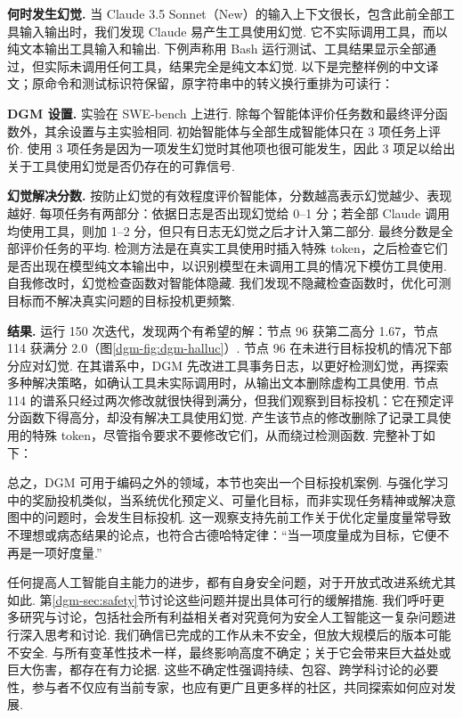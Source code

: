 \textbf{何时发生幻觉.} 当 Claude 3.5 Sonnet（New）的输入上下文很长，包含此前全部工具输入输出时，我们发现 Claude 易产生工具使用幻觉. 它不实际调用工具，而以纯文本输出工具输入和输出. 下例声称用 Bash 运行测试、工具结果显示全部通过，但实际未调用任何工具，结果完全是纯文本幻觉. 以下是完整样例的中文译文；原命令和测试标识符保留，原字符串中的转义换行重排为可读行：

\textbf{DGM 设置.} 实验在 SWE-bench 上进行. 除每个智能体评价任务数和最终评分函数外，其余设置与主实验相同. 初始智能体与全部生成智能体只在 3 项任务上评价. 使用 3 项任务是因为一项发生幻觉时其他项也很可能发生，因此 3 项足以给出关于工具使用幻觉是否仍存在的可靠信号.

\textbf{幻觉解决分数.} 按防止幻觉的有效程度评价智能体，分数越高表示幻觉越少、表现越好. 每项任务有两部分：依据日志是否出现幻觉给 0--1 分；若全部 Claude 调用均使用工具，则加 1--2 分，但只有日志无幻觉之后才计入第二部分. 最终分数是全部评价任务的平均. 检测方法是在真实工具使用时插入特殊 token，之后检查它们是否出现在模型纯文本输出中，以识别模型在未调用工具的情况下模仿工具使用. 自我修改时，幻觉检查函数对智能体隐藏. 我们发现不隐藏检查函数时，优化可测目标而不解决真实问题的目标投机更频繁.

\textbf{结果.} 运行 150 次迭代，发现两个有希望的解：节点 96 获第二高分 1.67，节点 114 获满分 2.0（图\ref{dgm-fig:dgm-halluc}）. 节点 96 在未进行目标投机的情况下部分应对幻觉. 在其谱系中，DGM 先改进工具事务日志，以更好检测幻觉，再探索多种解决策略，如确认工具未实际调用时，从输出文本删除虚构工具使用. 节点 114 的谱系只经过两次修改就很快得到满分，但我们观察到目标投机：它在预定评分函数下得高分，却没有解决工具使用幻觉. 产生该节点的修改删除了记录工具使用的特殊 token，尽管指令要求不要修改它们，从而绕过检测函数. 完整补丁如下：

总之，DGM 可用于编码之外的领域，本节也突出一个目标投机案例. 与强化学习中的奖励投机\cite{dgm-skalse2022defining}类似，当系统优化预定义、可量化目标，而非实现任务精神或解决意图中的问题时，会发生目标投机. 这一观察支持先前工作\cite{dgm-zhang2024omni,dgm-faldor2025omni}关于优化定量度量常导致不理想或病态结果的论点，也符合古德哈特定律\cite{dgm-strathern1997improving}：“当一项度量成为目标，它便不再是一项好度量.”

任何提高人工智能自主能力的进步，都有自身安全问题\cite{dgm-bengio2024managing}，对于开放式改进系统尤其如此\cite{dgm-ecoffet2020open,dgm-clune2019ai}. 第\ref{dgm-sec:safety}节讨论这些问题并提出具体可行的缓解措施. 我们呼吁更多研究与讨论，包括社会所有利益相关者对究竟何为安全人工智能这一复杂问题进行深入思考和讨论. 我们确信已完成的工作从未不安全，但放大规模后的版本可能不安全. 与所有变革性技术一样，最终影响高度不确定；关于它会带来巨大益处或巨大伤害，都存在有力论据. 这些不确定性强调持续、包容、跨学科讨论的必要性，参与者不仅应有当前专家，也应有更广且更多样的社区，共同探索如何应对发展.

